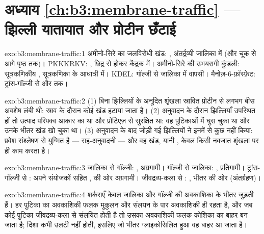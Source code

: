 \section*{अध्याय \ref{ch:b3:membrane-traffic} --- झिल्ली यातायात और प्रोटीन छँटाई}

\begin{solution}{exo:b3:membrane-traffic:1}
अमीनो-सिरे का जलविरोधी खंड: , अंतर्द्रव्यी जालिका में
(और चूक से आगे पृष्ठ तक)। PKKKRKV:
, छिद्र से होकर केंद्रक में।
अमीनो-सिरे की उभयरागी कुंडली: सूत्रकणिकीय , सूत्रकणिका के
आधात्री में। KDEL: गॉल्जी से जालिका में वापसी।
मैनोज़-6-फ़ॉस्फ़ेट: ट्रांस-गॉल्जी से 
और  तक।
\end{solution}

\begin{solution}{exo:b3:membrane-traffic:2}
(1) बिना झिल्लियों के अनूदित शृंखला स्रावित प्रोटीन से लगभग बीस अवशेष
लंबी थी: स्राव के दौरान कोई खंड हटाया जाता है। (2) अनुवादन के दौरान
झिल्लियाँ उपस्थित हों तो उत्पाद परिपक्व आकार का था और प्रोटिएज़ से
सुरक्षित था: वह पुटिकाओं में घुस चुका था और उनके भीतर खंड खो चुका था।
(3) अनुवादन के बाद जोड़ी गई झिल्लियों ने इनमें से कुछ नहीं किया: प्रवेश
संश्लेषण से युग्मित है --- सह-अनुवादनी --- और वह खंड, यानी , केवल किसी नवजात शृंखला पर ही काम करता है।
\end{solution}

\begin{solution}{exo:b3:membrane-traffic:3}
जालिका से गॉल्जी: , अग्रगामी। गॉल्जी से जालिका: ,
प्रतिगामी। ट्रांस-गॉल्जी से : अपने संयोजकों सहित ,
 की ओर अग्रगामी। जीवद्रव्य-कला से : ,
भीतर की ओर (अंतर्ग्रहण)।
\end{solution}

\begin{solution}{exo:b3:membrane-traffic:4}
शर्कराएँ केवल जालिका और गॉल्जी की अवकाशिका के भीतर जुड़ती हैं। हर
पुटिका का अवकाशिकी फलक मुकुलन और संलयन के पार अवकाशिकी ही रहता है, और
जब कोई पुटिका जीवद्रव्य-कला से संलयित होती है तो उसका अवकाशिकी फलक
कोशिका का बाहर बन जाता है; दिशा कभी उलटी नहीं होती, इसलिए जो भीतर
ग्लाइकोसिलित हुआ वह बाहर आ जाता है।
\end{solution}

